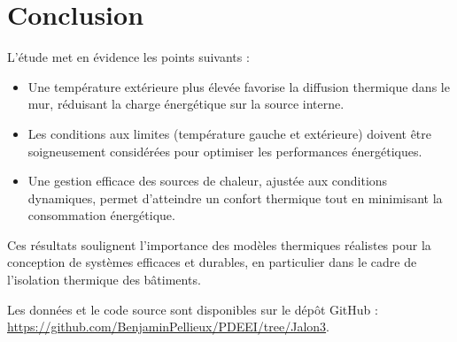 \documentclass[a4paper,11pt]{article}
\begin{document}
\section{Conclusion}

L'étude met en évidence les points suivants :
\begin{itemize}
    \item Une température extérieure plus élevée favorise la diffusion thermique dans le mur, réduisant la charge énergétique sur la source interne.
    \item Les conditions aux limites (température gauche et extérieure) doivent être soigneusement considérées pour optimiser les performances énergétiques.
    \item Une gestion efficace des sources de chaleur, ajustée aux conditions dynamiques, permet d'atteindre un confort thermique tout en minimisant la consommation énergétique.
\end{itemize}

Ces résultats soulignent l'importance des modèles thermiques réalistes pour la conception de systèmes efficaces et durables, en particulier dans le cadre de l'isolation thermique des bâtiments.

Les données et le code source sont disponibles sur le dépôt GitHub : \\ \url{https://github.com/BenjaminPellieux/PDEEI/tree/Jalon3}.

\newpage
\end{document}
